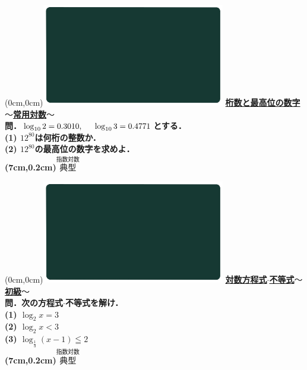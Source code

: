 \documentclass[10pt,
fleqn,
dvipdfmx,
uplatex
]{jsarticle}
\begin{document}
\at(0cm,0cm){\includegraphics[width=8cm,bb=0 0 1920 1080]{./youtube/thumbnails/templates/smart_background/指数対数.jpeg}}
{\color{orange}\bf\boldmath\large\underline{桁数と最高位の数字$〜$常用対数$〜$}}\vspace{0.3zw}\\
\Large 
\bf\boldmath 問．$\log _{10}2=0.{3010},\;\\\ \ \ \ \log _{10}3=0.{4771}$とする．\vspace{0.3zw}\\
(1)  ${12}^{80}$は何桁の整数か．\\
(2)  ${12}^{80}$の最高位の数字を求めよ．\\

\at(7cm,0.2cm){\small\color{bradorange}$\overset{\text{指数対数}}{\text{典型}}$}

\newpage

\at(0cm,0cm){\includegraphics[width=8cm,bb=0 0 1920 1080]{./youtube/thumbnails/templates/smart_background/指数対数.jpeg}}
{\color{orange}\bf\boldmath\Large\underline{対数方程式$\cdot$不等式$〜$初級$〜$}}\vspace{0.3zw}\\
\Large 
\bf\boldmath 問．次の方程式$\cdot$不等式を解け．\vspace{0.3zw}\\
(1)  $\log _2x=3$\\
(2)  $\log _2x<3$\\
(3)  $\log _{\frac{1}{3}}\left(x-1\right)\leqq 2$\\

\at(7cm,0.2cm){\small\color{bradorange}$\overset{\text{指数対数}}{\text{典型}}$}
\end{document}

